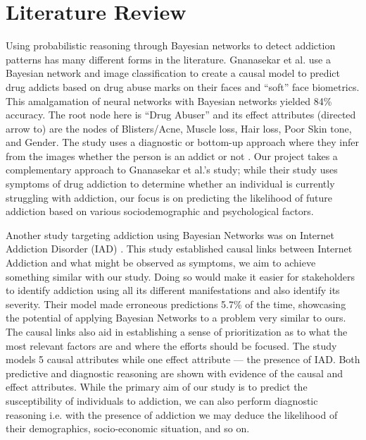 \documentclass[conference]{IEEEtran}
\begin{document}
\section{Literature Review}
Using probabilistic reasoning through Bayesian networks to detect addiction patterns has many different forms in the literature. Gnanasekar et al. use a Bayesian network and image classification to create a causal model to predict drug addicts based on drug abuse marks on their faces and “soft” face biometrics. This amalgamation of neural networks with Bayesian networks yielded 84\% accuracy. The root node here is “Drug Abuser” and its effect attributes (directed arrow to) are the nodes of Blisters/Acne, Muscle loss, Hair loss, Poor Skin tone, and Gender. The study uses a diagnostic or bottom-up approach where they infer from the images whether the person is an addict or not \cite{gnanasekar_face_attributes_drug_addicts}. Our project takes a complementary approach to Gnanasekar et al.’s study; while their study uses symptoms of drug addiction to determine whether an individual is currently struggling with addiction, our focus is on predicting the likelihood of future addiction based on various sociodemographic and psychological factors.

Another study targeting addiction using Bayesian Networks was on Internet Addiction Disorder (IAD) \cite{singh_internet_addiction_bayesian}. This study established causal links between Internet Addiction and what might be observed as symptoms, we aim to achieve something similar with our study. Doing so would make it easier for stakeholders to identify addiction using all its different manifestations and also identify its severity. Their model made erroneous predictions 5.7\% of the time, showcasing the potential of applying Bayesian Networks to a problem very similar to ours. The causal links also aid in establishing a sense of prioritization as to what the most relevant factors are and where the efforts should be focused. The study models 5 causal attributes while one effect attribute — the presence of IAD. Both predictive and diagnostic reasoning are shown with evidence of the causal and effect attributes. While the primary aim of our study is to predict the susceptibility of individuals to addiction, we can also perform diagnostic reasoning i.e. with the presence of addiction we may deduce the likelihood of their demographics, socio-economic situation, and so on.
\end{document}
